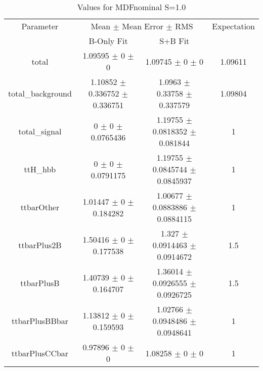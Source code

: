 \begin{table}
\centering
\caption{Values for MDFnominal S=1.0}
\begin{tabular}{cccc}
\toprule
Parameter & \multicolumn{2}{c}{Mean $\pm$ Mean Error $\pm$ RMS} & Expectation\\
 & B-Only Fit & S+B Fit & \\
\midrule
total & \num{1.09595} $\pm$ \num{0} $\pm$ \num{0} & \num{1.09745} $\pm$ \num{0} $\pm$ \num{0} & \num{1.09611}\\
total\_background & \num{1.10852} $\pm$ \num{0.336752} $\pm$ \num{0.336751} & \num{1.0963} $\pm$ \num{0.33758} $\pm$ \num{0.337579} & \num{1.09804}\\
total\_signal & \num{0} $\pm$ \num{0} $\pm$ \num{0.0765436} & \num{1.19755} $\pm$ \num{0.0818352} $\pm$ \num{0.081844} & \num{1}\\
ttH\_hbb & \num{0} $\pm$ \num{0} $\pm$ \num{0.0791175} & \num{1.19755} $\pm$ \num{0.0845744} $\pm$ \num{0.0845937} & \num{1}\\
ttbarOther & \num{1.01447} $\pm$ \num{0} $\pm$ \num{0.184282} & \num{1.00677} $\pm$ \num{0.0883886} $\pm$ \num{0.0884115} & \num{1}\\
ttbarPlus2B & \num{1.50416} $\pm$ \num{0} $\pm$ \num{0.177538} & \num{1.327} $\pm$ \num{0.0914463} $\pm$ \num{0.0914672} & \num{1.5}\\
ttbarPlusB & \num{1.40739} $\pm$ \num{0} $\pm$ \num{0.164707} & \num{1.36014} $\pm$ \num{0.0926555} $\pm$ \num{0.0926725} & \num{1.5}\\
ttbarPlusBBbar & \num{1.13812} $\pm$ \num{0} $\pm$ \num{0.159593} & \num{1.02766} $\pm$ \num{0.0948486} $\pm$ \num{0.0948641} & \num{1}\\
ttbarPlusCCbar & \num{0.97896} $\pm$ \num{0} $\pm$ \num{0} & \num{1.08258} $\pm$ \num{0} $\pm$ \num{0} & \num{1}\\
\bottomrule
\end{tabular}
\end{table}